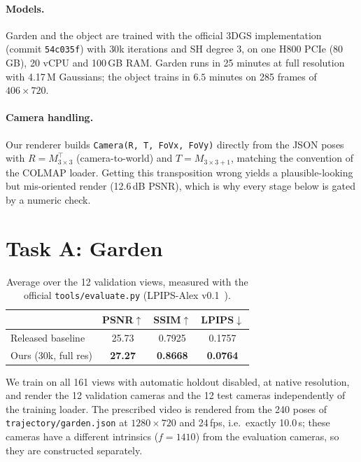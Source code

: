 \documentclass[10pt,twocolumn,letterpaper]{article}
\begin{document}
\paragraph{Models.} Garden and the object are trained with the official 3DGS implementation~\cite{kerbl2023}
(commit \texttt{54c035f}) with $30$k iterations and SH degree 3, on one H800 PCIe (80\,GB),
20 vCPU and 100\,GB RAM. Garden runs in 25 minutes at full resolution with 4.17\,M Gaussians;
the object trains in $6.5$ minutes on 285 frames of $406\times720$.

\paragraph{Camera handling.} Our renderer builds \texttt{Camera(R, T, FoVx, FoVy)} directly from
the JSON poses with $R=M_{3\times3}^{\top}$ (camera-to-world) and $T=M_{3\times3+1}$, matching the
convention of the COLMAP loader. Getting this transposition wrong yields a plausible-looking but
mis-oriented render (12.6\,dB PSNR), which is why every stage below is gated by a numeric check.

\section{Task A: Garden}

\begin{table}[t]
\centering\small
\setlength{\tabcolsep}{4pt}
\begin{tabular}{lccc}
\hline
 & PSNR$\uparrow$ & SSIM$\uparrow$ & LPIPS$\downarrow$\\
\hline
Released baseline & 25.73 & 0.7925 & 0.1757\\
Ours (30k, full res) & \textbf{27.27} & \textbf{0.8668} & \textbf{0.0764}\\
\hline
\end{tabular}
\caption{Average over the 12 validation views, measured with the official
\texttt{tools/evaluate.py} (LPIPS-Alex v0.1~\cite{zhang2018}).}
\label{tab:garden}
\end{table}

We train on all 161 views with automatic holdout disabled, at native resolution, and render the
12 validation cameras and the 12 test cameras independently of the training loader. The
prescribed video is rendered from the 240 poses of \texttt{trajectory/garden.json} at
$1280\times720$ and 24\,fps, i.e.\ exactly 10.0\,s; these cameras have a different intrinsics
($f=1410$) from the evaluation cameras, so they are constructed separately.
\end{document}
